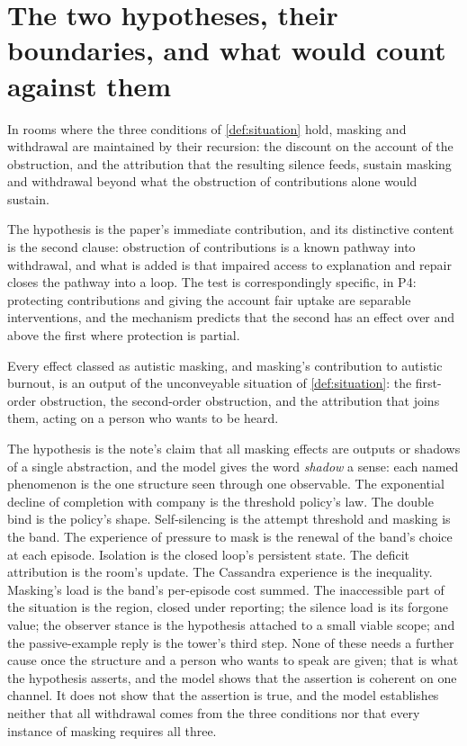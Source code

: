 \section{The two hypotheses, their boundaries, and what would count against them}\label{sec:hypothesis}

\begin{hypothesis}\label{hyp:mechanism}
In rooms where the three conditions of \autoref{def:situation} hold, masking and withdrawal are maintained by their recursion: the discount on the account of the obstruction, and the attribution that the resulting silence feeds, sustain masking and withdrawal beyond what the obstruction of contributions alone would sustain.
\end{hypothesis}

The hypothesis is the paper's immediate contribution, and its distinctive content is the second clause: obstruction of contributions is a known pathway into withdrawal, and what is added is that impaired access to explanation and repair closes the pathway into a loop. The test is correspondingly specific, in P4: protecting contributions and giving the account fair uptake are separable interventions, and the mechanism predicts that the second has an effect over and above the first where protection is partial.

\begin{hypothesis}\label{hyp:root}
Every effect classed as autistic masking, and masking's contribution to autistic burnout, is an output of the unconveyable situation of \autoref{def:situation}: the first-order obstruction, the second-order obstruction, and the attribution that joins them, acting on a person who wants to be heard.
\end{hypothesis}

The hypothesis is the note's claim that all masking effects are outputs or shadows of a single abstraction, and the model gives the word \emph{shadow} a sense: each named phenomenon is the one structure seen through one observable. The exponential decline of completion with company is the threshold policy's law. The double bind is the policy's shape. Self-silencing is the attempt threshold and masking is the band. The experience of pressure to mask is the renewal of the band's choice at each episode. Isolation is the closed loop's persistent state. The deficit attribution is the room's update. The Cassandra experience is the inequality. Masking's load is the band's per-episode cost summed. The inaccessible part of the situation is the region, closed under reporting; the silence load is its forgone value; the observer stance is the hypothesis attached to a small viable scope; and the passive-example reply is the tower's third step. None of these needs a further cause once the structure and a person who wants to speak are given; that is what the hypothesis asserts, and the model shows that the assertion is coherent on one channel. It does not show that the assertion is true, and the model establishes neither that all withdrawal comes from the three conditions nor that every instance of masking requires all three.

